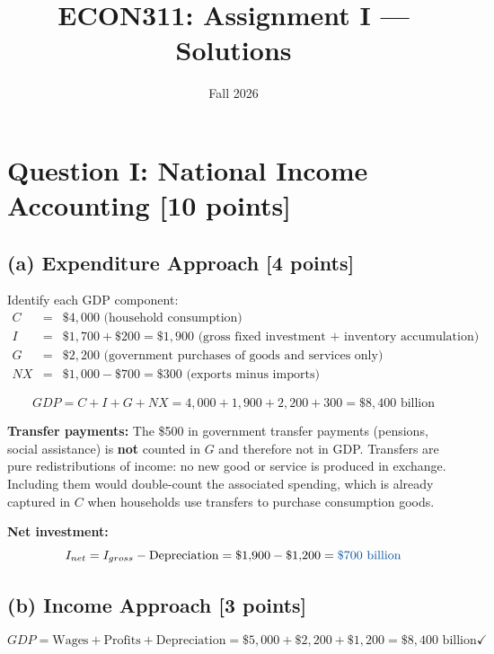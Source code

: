 \documentclass[letterpaper,12pt]{article}
\title{ECON311: Assignment I --- Solutions}
\author{}
\date{Fall 2026}
\begin{document}
\maketitle
\vspace{-.4in}

\section*{Question I: National Income Accounting [10 points]}

\subsection*{(a) Expenditure Approach [4 points]}

Identify each GDP component:
\begin{eqnarray*}
C &=& \$4{,}000 \text{ (household consumption)} \\
I &=& \$1{,}700 + \$200 = \$1{,}900 \text{ (gross fixed investment + inventory accumulation)} \\
G &=& \$2{,}200 \text{ (government purchases of goods and services only)} \\
NX &=& \$1{,}000 - \$700 = \$300 \text{ (exports minus imports)}
\end{eqnarray*}

\textcolor{sol}{
\[
GDP = C + I + G + NX = 4{,}000 + 1{,}900 + 2{,}200 + 300 = \$8{,}400 \text{ billion}
\]
}

\noindent\textbf{Transfer payments:} The \$500 in government transfer payments (pensions, social assistance) is \textbf{not} counted in $G$ and therefore not in GDP. Transfers are pure redistributions of income: no new good or service is produced in exchange. Including them would double-count the associated spending, which is already captured in $C$ when households use transfers to purchase consumption goods.

\noindent\textbf{Net investment:}
\[
I_{net} = I_{gross} - \text{Depreciation} = \$1{,}900 - \$1{,}200 = \textcolor{sol}{\$700 \text{ billion}}
\]

\subsection*{(b) Income Approach [3 points]}

\textcolor{sol}{
\[
GDP = \text{Wages} + \text{Profits} + \text{Depreciation} = \$5{,}000 + \$2{,}200 + \$1{,}200 = \$8{,}400 \text{ billion} \checkmark
\]
}
\end{document}
